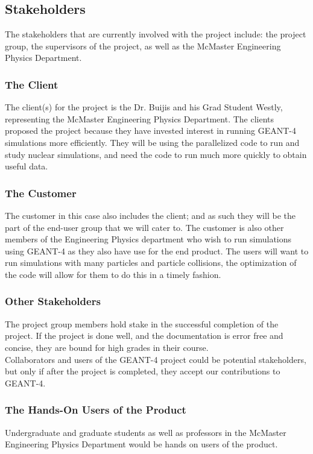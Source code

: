 \documentclass[12pt]{article}
\begin{document}
\subsection{Stakeholders} %
The stakeholders that are currently involved with the project include: the project group, the supervisors of the project, as well as the McMaster Engineering Physics Department.

\subsubsection{The Client}
The client(s) for the project is the Dr. Buijis and his Grad Student Westly, representing the McMaster Engineering Physics Department. The clients proposed the project because they have invested interest in running GEANT-4 simulations more efficiently. They will be using the parallelized code to run and study nuclear simulations, and need the code to run much more quickly to obtain useful data.
	
\subsubsection{The Customer}
The customer in this case also includes the client; and as such they will be the part of the end-user group that we will cater to.
The customer is also other members of the Engineering Physics department who wish to run simulations using GEANT-4 as they also have use for the end product. The users will want to run simulations with many particles and particle collisions, the optimization of the code will allow for them to do this in a timely fashion.
	
\subsubsection{Other Stakeholders}
The project group members hold stake in the successful completion of the project. If the project is done well, and the documentation is error free and concise, they are bound for high grades in their course.\\

Collaborators and users of the GEANT-4 project could be potential stakeholders, but only if after the project is completed, they accept our contributions to GEANT-4.

\subsubsection{The Hands-On Users of the Product}
Undergraduate and graduate students as well as professors in the McMaster Engineering Physics Department would be hands on users of the product. 
\end{document}

